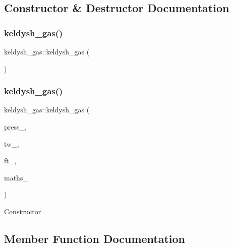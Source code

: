 \subsection{Constructor \& Destructor Documentation}
\mbox{\label{classkeldysh__gas_a25e559700c04e93efb560db511adbe72}} 
\subsubsection{\texorpdfstring{keldysh\+\_\+gas()}{keldysh\_gas()}\hspace{0.1cm}{\footnotesize\ttfamily [1/2]}}
{\footnotesize\ttfamily keldysh\+\_\+gas\+::keldysh\+\_\+gas (\begin{DoxyParamCaption}{ }\end{DoxyParamCaption})}

\mbox{\label{classkeldysh__gas_a8175a1520a2a7cd90b81d9af3ac64c91}} 
\subsubsection{\texorpdfstring{keldysh\+\_\+gas()}{keldysh\_gas()}\hspace{0.1cm}{\footnotesize\ttfamily [2/2]}}
{\footnotesize\ttfamily keldysh\+\_\+gas\+::keldysh\+\_\+gas (\begin{DoxyParamCaption}\item[{double}]{press\+\_\+,  }\item[{\hyperlink{classgrid__tw}{grid\+\_\+tw} \&}]{tw\+\_\+,  }\item[{D\+F\+T\+I\+\_\+\+D\+E\+S\+C\+R\+I\+P\+T\+O\+R\+\_\+\+H\+A\+N\+D\+LE \&}]{ft\+\_\+,  }\item[{\hyperlink{classmaths__textbook}{maths\+\_\+textbook} \&}]{maths\+\_\+ }\end{DoxyParamCaption})}

Constructor 

\subsection{Member Function Documentation}
\mbox{\label{classkeldysh__gas_acfa0604a6f00bce28b72b9a07fb79314}} 
